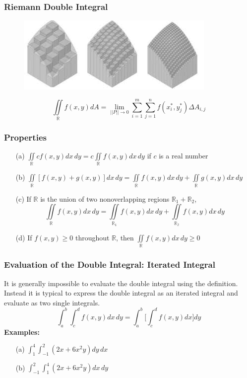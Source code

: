 \documentclass{beamer}
\begin{document}
\begin{frame}
\frametitle{\textbf{Riemann Double Integral}}
\begin{figure}
	\centering
	\includegraphics[width=.95\textwidth]{img_approx.jpg}
	\hspace*{10pt}\hbox{}
\end{figure}
$$\iint\limits_{\mathbb{R}} f(x,y) dA = \lim\limits_{||\mathit{P}||\rightarrow 0} \sum_{i=1}^m \sum_{j=1}^n f(x_i^*,y_j^*)\Delta A_{i,j}$$
\end{frame}

\begin{frame}
\frametitle{\textbf{Properties}}
\begin{itemize}
	\item[(a)] $\iint\limits_{\mathbb{R}} c f(x,y) dx\,dy = c \iint\limits_{\mathbb{R}} f(x,y)dx\,dy$ if $c$ is a real number
	\item[(b)] $\iint\limits_{\mathbb{R}} [f(x,y) + g(x,y)] dx \,dy = \iint\limits_{\mathbb{R}} f(x,y)dx\,dy + \iint\limits_{\mathbb{R}} g(x,y)dx\,dy$
	\item[(c)] If $\mathbb{R}$ is the union of two nonoverlapping regions $\mathbb{R}_1 + \mathbb{R}_2$,
	$$\iint\limits_{\mathbb{R}}f(x,y)dx\,dy = \iint\limits_{\mathbb{R_1}}f(x,y)dx\,dy + \iint\limits_{\mathbb{R_2}}f(x,y)dx\,dy$$
	\item[(d)] If $f(x,y) \geq 0$ throughout $\mathbb{R}$, then $\iint\limits_{\mathbb{R}} f(x,y)dx\,dy \geq 0$
\end{itemize}
\end{frame}

\begin{frame}
\frametitle{\textbf{Evaluation of the Double Integral: Iterated Integral}}
It is generally impossible to evaluate the double integral using the definition. Instead it is typical to express the double integral as an iterated integral and evaluate as two single integrals.
$$\int_a^b \int_c^d f(x,y)dx\,dy = \int_a^b \Bigg[\int_c^d f(x,y)dx\Bigg]dy$$
\vspace{12pt}
\textbf{Examples:}
\begin{itemize}
	\item [(a)] $\int_1^4 \int_{-1}^2 (2x+6x^2y)dy\,dx$
	\item[(b)] $\int_{-1}^2 \int_1^4  (2x+6x^2y)dx\,dy$
\end{itemize}
\end{frame}
\end{document}
